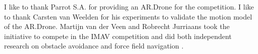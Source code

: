 I like to thank Parrot S.A. for providing an AR.Drone for the competition.
I like to thank Carsten van Weelden for his experiments to validate the motion model of the AR.Drone. 
Martijn van der Veen and Robrecht Jurriaans took the initiative to compete in the IMAV competition and did both independent research on obstacle avoidance \cite{Jurriaans2011} and force field navigation \cite{VanDerVeen2011}.
